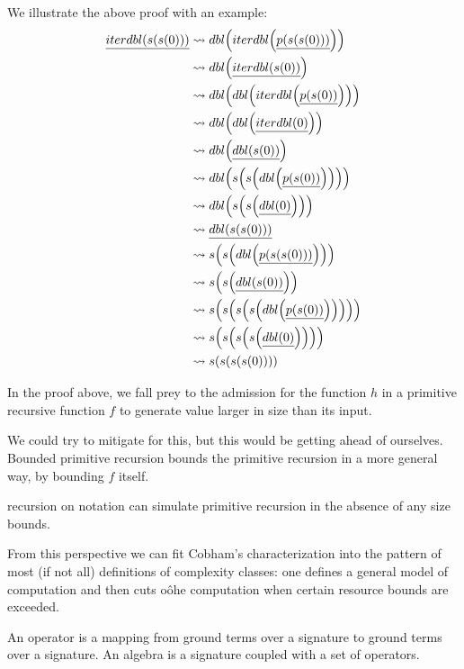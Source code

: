 \begin{example}
We illustrate the above proof with an example:
\begin{align}
\underline{iterdbl\p{s\p{s\p{0}}}}
  &\leadsto dbl\p{iterdbl\p{\underline{p\p{s\p{s\p{0}}}}}} \\
  &\leadsto dbl\p{\underline{iterdbl\p{s\p{0}}}} \\
  &\leadsto dbl\p{dbl\p{iterdbl\p{\underline{p\p{s\p{0}}}}}} \\
  &\leadsto dbl\p{dbl\p{\underline{iterdbl\p{0}}}} \\
  &\leadsto dbl\p{\underline{dbl\p{s\p{0}}}} \\
  &\leadsto dbl\p{s\p{s\p{dbl\p{\underline{p\p{s\p{0}}}}}}} \\
  &\leadsto dbl\p{s\p{s\p{\underline{dbl\p{0}}}}} \\
  &\leadsto \underline{dbl\p{s\p{s\p{0}}}} \\
  &\leadsto s\p{s\p{dbl\p{\underline{p\p{s\p{s\p{0}}}}}}} \\
  &\leadsto s\p{s\p{\underline{dbl\p{s\p{0}}}}} \\
  &\leadsto s\p{s\p{s\p{s\p{dbl\p{\underline{p\p{s\p{0}}}}}}}} \\
  &\leadsto s\p{s\p{s\p{s\p{\underline{dbl\p{0}}}}}} \\
  &\leadsto s\p{s\p{s\p{s\p{0}}}} \\
\end{align}
\end{example}

In the proof above, we fall prey to the admission for the function $h$ in a
primitive recursive function $f$ to generate value larger in size than its
input.

We could try to mitigate for this, but this would be getting ahead of
ourselves. Bounded primitive recursion bounds the primitive recursion in a more
general way, by bounding $f$ itself.

recursion on notation can simulate primitive recursion in the absence of any
size bounds\cite{bellantoni-phd-1992}.

From this perspective we can fit Cobham's characterization into the pattern of
most (if not all) definitions of complexity classes: one defines a general
model of computation and then cuts oôhe computation when certain resource
bounds are exceeded.

An operator is a mapping from ground terms over a signature to ground terms
over a signature. An algebra is a signature coupled with a set of operators.

